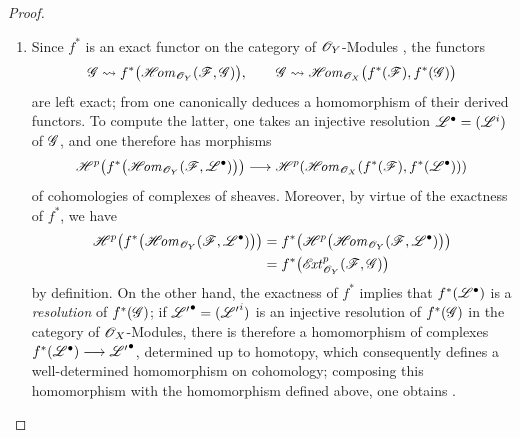 \begin{proof}
\begin{enumerate}
  \item[\rm(i)]
  Since $f^*$ is an exact functor on the category of $\mathscr{O}_Y$-Modules
  , the functors
  \[
    \mathscr{G}\leadsto
      f^*\bigl(\mathscr{H}\!\mathit{om}_{\mathscr{O}_Y}(\mathscr{F},\mathscr{G})\bigr),
    \qquad
    \mathscr{G}\leadsto
      \mathscr{H}\!\mathit{om}_{\mathscr{O}_X}\bigl(f^*(\mathscr{F}),f^*(\mathscr{G})\bigr)
  \]
  are left exact; from  one
  canonically deduces a homomorphism of their derived functors.
  To compute the latter, one takes an injective resolution
  $\mathscr{L}^\bullet=(\mathscr{L}^i)$ of $\mathscr{G}$, and one therefore has
  morphisms
  \[
    \begin{aligned}
    \mathscr{H}^p\!\left(
      f^*\bigl(\mathscr{H}\!\mathit{om}_{\mathscr{O}_Y}
        (\mathscr{F},\mathscr{L}^\bullet)\bigr)\right)
    \longrightarrow
    \mathscr{H}^p\!\left(
      \mathscr{H}\!\mathit{om}_{\mathscr{O}_X}
        (f^*(\mathscr{F}),f^*(\mathscr{L}^\bullet))\right)
    \end{aligned}
  \]
  of cohomologies of complexes of sheaves.
  Moreover, by virtue of the exactness of $f^*$, we have
  \[
    \begin{aligned}
    \mathscr{H}^p\!\left(f^*\bigl(\mathscr{H}\!\mathit{om}_{\mathscr{O}_Y}(\mathscr{F},\mathscr{L}^\bullet)\bigr)\right)
    &=f^*\!\left(\mathscr{H}^p\bigl(\mathscr{H}\!\mathit{om}_{\mathscr{O}_Y}(\mathscr{F},\mathscr{L}^\bullet)\bigr)\right)\\
    &=f^*\bigl(\mathscr{E}\!\mathit{xt}^p_{\mathscr{O}_Y}(\mathscr{F},\mathscr{G})\bigr)
    \end{aligned}
  \]
  by definition.
  On the other hand, the exactness of $f^*$ implies that
  $f^*(\mathscr{L}^\bullet)$ is a \emph{resolution} of $f^*(\mathscr{G})$;
  if ${\mathscr{L}'}^\bullet=({\mathscr{L}'}^i)$ is an injective resolution
  of $f^*(\mathscr{G})$ in the category of $\mathscr{O}_X$-Modules, there is therefore a
  homomorphism of complexes $f^*(\mathscr{L}^\bullet)\longrightarrow{\mathscr{L}'}^\bullet$,
  determined up to homotopy, which consequently defines a well-determined
  homomorphism on cohomology; composing this homomorphism with the
  homomorphism defined above, one obtains .


\end{enumerate}
\end{proof}
